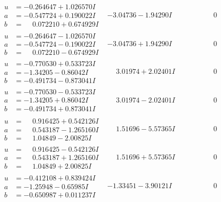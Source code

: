 \documentclass[1p]{elsarticle_modified}
\theoremstyle{definition}
\begin{document}
$$\begin{array}{c|c|c}
\begin{aligned}
u &= -0.264647 + 1.026570 I \\
a &= -0.547724 + 0.190022 I \\
b &= \phantom{-}0.072210 + 0.674929 I\end{aligned}
 & -3.04736 - 1.94290 I & \phantom{-0.000000 } 0 \\ \hline\begin{aligned}
u &= -0.264647 - 1.026570 I \\
a &= -0.547724 - 0.190022 I \\
b &= \phantom{-}0.072210 - 0.674929 I\end{aligned}
 & -3.04736 + 1.94290 I & \phantom{-0.000000 } 0 \\ \hline\begin{aligned}
u &= -0.770530 + 0.533723 I \\
a &= -1.34205 - 0.86042 I \\
b &= -0.491734 - 0.873041 I\end{aligned}
 & \phantom{-}3.01974 + 2.02401 I & \phantom{-0.000000 } 0 \\ \hline\begin{aligned}
u &= -0.770530 - 0.533723 I \\
a &= -1.34205 + 0.86042 I \\
b &= -0.491734 + 0.873041 I\end{aligned}
 & \phantom{-}3.01974 - 2.02401 I & \phantom{-0.000000 } 0 \\ \hline\begin{aligned}
u &= \phantom{-}0.916425 + 0.542126 I \\
a &= \phantom{-}0.543187 - 1.265160 I \\
b &= \phantom{-}1.04849 - 2.00825 I\end{aligned}
 & \phantom{-}1.51696 - 5.57365 I & \phantom{-0.000000 } 0 \\ \hline\begin{aligned}
u &= \phantom{-}0.916425 - 0.542126 I \\
a &= \phantom{-}0.543187 + 1.265160 I \\
b &= \phantom{-}1.04849 + 2.00825 I\end{aligned}
 & \phantom{-}1.51696 + 5.57365 I & \phantom{-0.000000 } 0 \\ \hline\begin{aligned}
u &= -0.412108 + 0.839424 I \\
a &= -1.25948 - 0.65985 I \\
b &= -0.650987 + 0.011237 I\end{aligned}
 & -1.33451 - 3.90121 I & \phantom{-0.000000 } 0 \\ \hline\begin{aligned}

\end{aligned}
\end{array}$$
\end{document}
